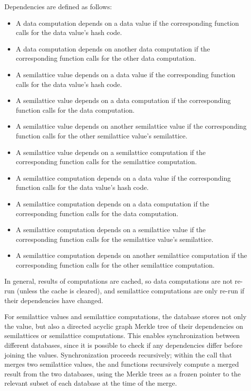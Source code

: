 \documentclass{article}
\begin{document}
    Dependencies are defined as follows:
    \begin{itemize}
      \item A data computation depends on a data value if the corresponding \evaldatacomputation function calls \hashlookup for the data value's hash code.
      \item A data computation depends on another data computation if the corresponding \evaldatacomputation function calls \datacomputationlookup for the other data computation.
      \item A semilattice value depends on a data value if the corresponding \checkelem function calls \hashlookup for the data value's hash code.
      \item A semilattice value depends on a data computation if the corresponding \checkelem function calls \datacomputationlookup for the data computation.
      \item A semilattice value depends on another semilattice value if the corresponding \checkelem function calls \latticelookup for the other semilattice value's semilattice.
      \item A semilattice value depends on a semilattice computation if the corresponding \checkelem function calls \latticecomputationlookup for the semilattice computation.
      \item A semilattice computation depends on a data value if the corresponding \evallatticecomputation function calls \hashlookup for the data value's hash code.
      \item A semilattice computation depends on a data computation if the corresponding \evallatticecomputation function calls \datacomputationlookup for the data computation.
      \item A semilattice computation depends on a semilattice value if the corresponding \evallatticecomputation function calls \latticelookup for the semilattice value's semilattice.
      \item A semilattice computation depends on another semilattice computation if the corresponding \evallatticecomputation function calls \latticecomputationlookup for the other semilattice computation.
    \end{itemize}

    In general, results of computations are cached, so data computations are not re-run (unless the cache is cleared), and semilattice computations are only re-run if their dependencies have changed.

    For semilattice values and semilattice computations, the database stores not only the value, but also a directed acyclic graph Merkle tree of their dependencies on semilattices or semilattice computations. This enables synchronization between different databases, since it is possible to check if any dependencies differ before joining the values. Synchronization proceeds recursively; within the \join call that merges two semilattice values, the \latticelookup and \latticecomputationlookup functions recursively compute a merged result from the two databases, using the Merkle trees as a frozen pointer to the relevant subset of each database at the time of the merge.
\end{document}
